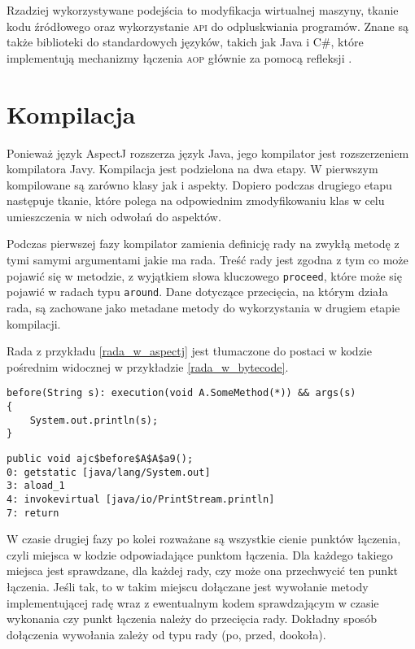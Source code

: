 \documentclass[a4paper,12pt]{mwbk}
\begin{document}
Rzadziej wykorzystywane podejścia to modyfikacja wirtualnej maszyny, tkanie kodu
źródłowego oraz wykorzystanie \textsc{api} do odpluskwiania programów.  Znane
są także biblioteki do standardowych języków, takich jak Java i C\#, które
implementują mechanizmy łączenia \textsc{aop} głównie za pomocą refleksji
\cite{aosd}.

\section{Kompilacja}

Ponieważ język AspectJ rozszerza język Java, jego kompilator jest rozszerzeniem
kompilatora Javy. Kompilacja jest podzielona na dwa etapy. W pierwszym
kompilowane są zarówno klasy jak i aspekty. Dopiero podczas drugiego etapu
następuje tkanie, które polega na odpowiednim zmodyfikowaniu klas w celu
umieszczenia w nich odwołań do aspektów.

Podczas pierwszej fazy kompilator zamienia definicję rady na zwykłą metodę z
tymi samymi argumentami jakie ma rada. Treść rady jest zgodna z tym co może
pojawić się w metodzie, z wyjątkiem słowa kluczowego \lstinline!proceed!, które
może się pojawić w radach typu \lstinline!around!. Dane dotyczące przecięcia,
na którym działa rada, są zachowane jako metadane metody do wykorzystania w
drugiem etapie kompilacji. 


Rada z przykładu \ref{rada_w_aspectj} jest tłumaczone do postaci w kodzie
pośrednim widocznej w przykładzie \ref{rada_w_bytecode}.

\begin{lstlisting}[style=AspectJ,caption=Rada w języku AspectJ,label=rada_w_aspectj]
before(String s): execution(void A.SomeMethod(*)) && args(s)
{
    System.out.println(s);
}
\end{lstlisting}

\begin{lstlisting}[style=AspectJ,caption=Kod pośredni rady,label=rada_w_bytecode]
public void ajc$before$A$A$a9();
0: getstatic [java/lang/System.out]
3: aload_1
4: invokevirtual [java/io/PrintStream.println]
7: return
\end{lstlisting}

W czasie drugiej fazy po kolei rozważane są wszystkie cienie punktów łączenia,
czyli miejsca w kodzie odpowiadające punktom łączenia. Dla każdego takiego
miejsca jest sprawdzane, dla każdej rady, czy może ona przechwycić ten punkt
łączenia. Jeśli tak, to w takim miejscu dołączane jest wywołanie metody
implementującej radę wraz z ewentualnym kodem sprawdzającym w czasie wykonania
czy punkt łączenia należy do przecięcia rady. Dokładny sposób dołączenia
wywołania zależy od typu rady (po, przed, dookoła).
\end{document}
